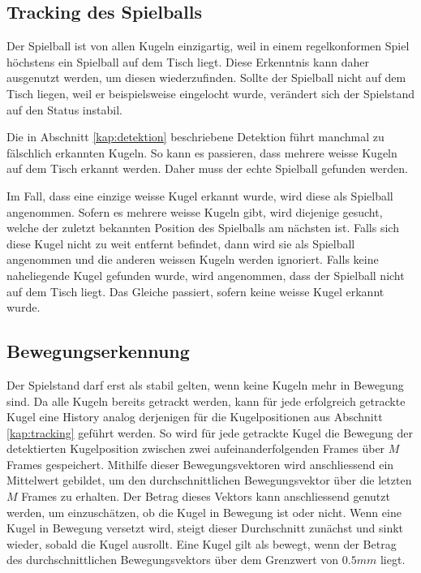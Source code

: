 \subsection{Tracking des Spielballs}
Der Spielball ist von allen Kugeln einzigartig, weil in einem regelkonformen Spiel höchstens ein Spielball auf dem Tisch liegt.
Diese Erkenntnis kann daher ausgenutzt werden, um diesen wiederzufinden.
Sollte der Spielball nicht auf dem Tisch liegen, weil er beispielsweise eingelocht wurde, verändert sich der Spielstand auf den Status instabil.

Die in Abschnitt \ref{kap:detektion} beschriebene Detektion führt manchmal zu fälschlich erkannten Kugeln.
So kann es passieren, dass mehrere weisse Kugeln auf dem Tisch erkannt werden.
Daher muss der echte Spielball gefunden werden.

Im Fall, dass eine einzige weisse Kugel erkannt wurde, wird diese als Spielball angenommen.
Sofern es mehrere weisse Kugeln gibt, wird diejenige gesucht, welche der zuletzt bekannten Position des Spielballs am nächsten ist.
Falls sich diese Kugel nicht zu weit entfernt befindet, dann wird sie als Spielball angenommen und die
anderen weissen Kugeln werden ignoriert.
Falls keine naheliegende Kugel gefunden wurde, wird angenommen, dass der Spielball nicht auf dem Tisch liegt.
Das Gleiche passiert, sofern keine weisse Kugel erkannt wurde.

\subsection{Bewegungserkennung}
Der Spielstand darf erst als stabil gelten, wenn keine Kugeln mehr in Bewegung sind.
Da alle Kugeln bereits getrackt werden, kann für jede erfolgreich getrackte Kugel eine History analog derjenigen für die
Kugelpositionen aus Abschnitt \ref{kap:tracking} geführt werden.
So wird für jede getrackte Kugel die Bewegung der detektierten Kugelposition zwischen zwei aufeinanderfolgenden Frames
über $M$ Frames gespeichert.
Mithilfe dieser Bewegungsvektoren wird anschliessend ein Mittelwert gebildet, um den durchschnittlichen Bewegungsvektor über
die letzten $M$ Frames zu erhalten.
Der Betrag dieses Vektors kann anschliessend genutzt werden, um einzuschätzen, ob die Kugel in Bewegung ist oder nicht.
Wenn eine Kugel in Bewegung versetzt wird, steigt dieser Durchschnitt zunächst und sinkt wieder, sobald die Kugel ausrollt.
Eine Kugel gilt als bewegt, wenn der Betrag des durchschnittlichen Bewegungsvektors über dem Grenzwert von $0.5mm$ liegt.

